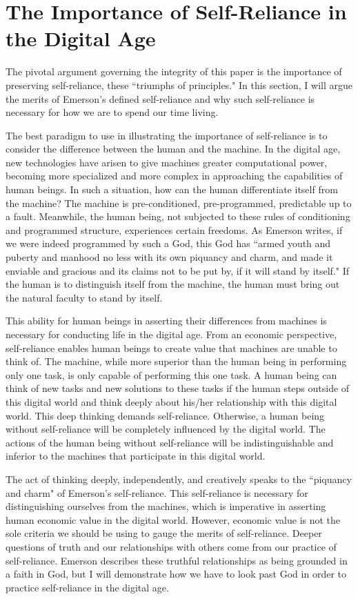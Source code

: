 \documentclass[12pt,letterpaper]{article}
\begin{document}
\section{The Importance of Self-Reliance in the Digital Age}
The pivotal argument governing the integrity of this paper is the importance of preserving self-reliance, these ``triumphs of principles."  In this section, I will argue the merits of Emerson's defined self-reliance and why such self-reliance is necessary for how we are to spend our time living.

The best paradigm to use in illustrating the importance of self-reliance is to consider the difference between the human and the machine.  In the digital age, new technologies have arisen to give machines greater computational power, becoming more specialized and more complex in approaching the capabilities of human beings.  In such a situation,  how can the human differentiate itself from the machine?  The machine is pre-conditioned, pre-programmed, predictable up to a fault.  Meanwhile, the human being, not subjected to these rules of conditioning and programmed structure, experiences certain freedoms.  As Emerson writes, if we were indeed programmed by such a God, this God has ``armed youth and puberty and manhood no less with its own piquancy and charm, and made it enviable and gracious and its claims not to be put by, if it will stand by itself."  If the human is to distinguish itself from the machine, the human must bring out the natural faculty to stand by itself.

This ability for human beings in asserting their differences from machines is necessary for conducting life in the digital age.  From an economic perspective, self-reliance enables human beings to create value that machines are unable to think of.  The machine, while more superior than the human being in performing only one task, is only capable of performing this one task.  A human being can think of new tasks and new solutions to these tasks if the human steps outside of this digital world and think deeply about his/her relationship with this digital world.  This deep thinking demands self-reliance.   Otherwise, a human being without self-reliance will be completely influenced by the digital world.  The actions of the human being without self-reliance will be indistinguishable and inferior to the machines that participate in this digital world. 

The act of thinking deeply, independently, and creatively speaks to the ``piquancy and charm" of Emerson's self-reliance.  This self-reliance is necessary for distinguishing ourselves from the machines, which is imperative in asserting human economic value in the digital world.  However, economic value is not the sole criteria we should be using to gauge the merits of self-reliance.  Deeper questions of truth and our relationships with others come from our practice of self-reliance.  Emerson describes these truthful relationships as being grounded in a faith in God, but I will demonstrate how we have to look past God in order to practice self-reliance in the digital age.
\end{document}
